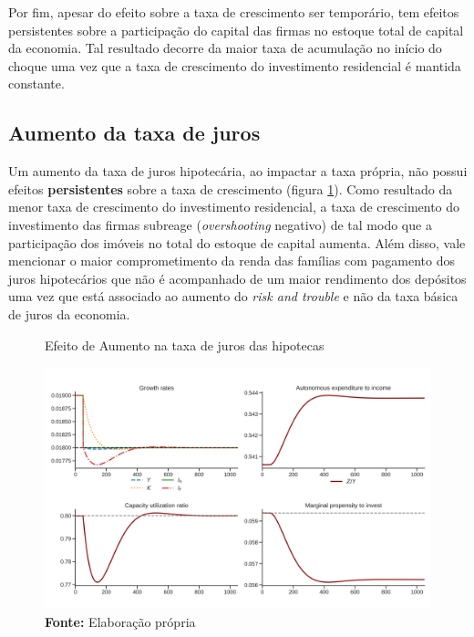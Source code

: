 Por fim, apesar do efeito sobre a taxa de crescimento ser temporário, tem efeitos persistentes sobre a participação do capital das firmas no estoque total de capital da economia. Tal resultado decorre da maior taxa de acumulação no início do choque uma vez que a taxa de crescimento do investimento residencial é mantida constante. 

\subsection*{Aumento da taxa de juros}

Um aumento da taxa de juros hipotecária, ao impactar a taxa própria, não possui efeitos \textbf{persistentes} sobre a taxa de crescimento (figura \ref{choque_3}). Como resultado da menor taxa de crescimento do investimento residencial, a taxa de crescimento do investimento das firmas subreage (\textit{overshooting} negativo) de tal modo que a participação dos imóveis no total do estoque de capital aumenta. Além disso, vale mencionar o maior comprometimento da renda das famílias com pagamento dos juros hipotecários que não é acompanhado de um maior rendimento dos depósitos uma vez que está associado ao aumento do \textit{risk and trouble} e não da taxa básica de juros da economia.

\begin{figure}[H]
	\centering
	\caption{Efeito de Aumento na taxa de juros das hipotecas}
	\label{choque_3}
	\includegraphics[width=\textwidth]{../../Modelo/Versoes/Shock_3.png}
	\caption*{\textbf{Fonte:} Elaboração própria}
\end{figure}


